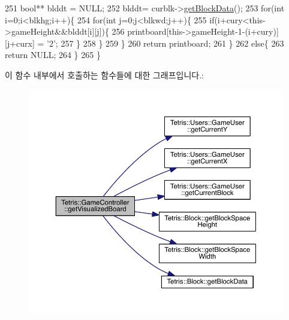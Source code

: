 \begin{DoxyCode}
251                      \textcolor{keywordtype}{bool}** blddt = NULL;
252                     blddt= curblk->\hyperlink{class_tetris_1_1_block_a9bd2c3d6ccacff9a5f56f72336ba324f}{getBlockData}();
253                     \textcolor{keywordflow}{for}(\textcolor{keywordtype}{int} i=0;i<blkhg;i++)\{
254                         \textcolor{keywordflow}{for}(\textcolor{keywordtype}{int} j=0;j<blkwd;j++)\{
255                             \textcolor{keywordflow}{if}(i+cury<this->gameHeight&&blddt[i][j])\{
256                                 printboard[this->gameHeight-1-(i+cury)][j+curx] = \textcolor{charliteral}{'2'};
257                             \}
258                         \}
259                     \}
260                     \textcolor{keywordflow}{return} printboard;
261                 \}
262                 \textcolor{keywordflow}{else}\{
263                     \textcolor{keywordflow}{return} NULL;
264                 \}
265             \}
\end{DoxyCode}
이 함수 내부에서 호출하는 함수들에 대한 그래프입니다.\+:
\nopagebreak
\begin{figure}[H]
\begin{center}
\leavevmode
\includegraphics[width=350pt]{db/dd2/class_tetris_1_1_game_controller_a78b39bdb39707e119d6e708bdb2aca17_cgraph}
\end{center}
\end{figure}
\mbox{\label{class_tetris_1_1_game_controller_aa0d81626f41c784dc256069293719e5f}} 
